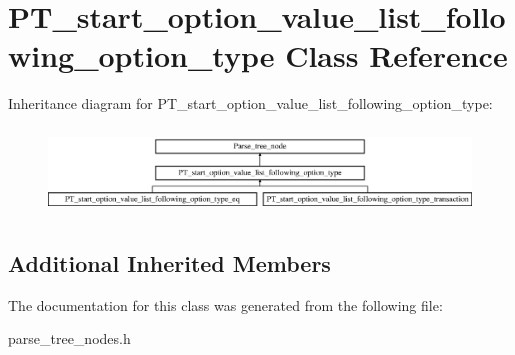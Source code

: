 \hypertarget{classPT__start__option__value__list__following__option__type}{}\section{P\+T\+\_\+start\+\_\+option\+\_\+value\+\_\+list\+\_\+following\+\_\+option\+\_\+type Class Reference}
\label{classPT__start__option__value__list__following__option__type}
Inheritance diagram for P\+T\+\_\+start\+\_\+option\+\_\+value\+\_\+list\+\_\+following\+\_\+option\+\_\+type\+:\begin{figure}[H]
\begin{center}
\leavevmode
\includegraphics[height=2.301370cm]{classPT__start__option__value__list__following__option__type}
\end{center}
\end{figure}
\subsection*{Additional Inherited Members}


The documentation for this class was generated from the following file\+:\begin{DoxyCompactItemize}
\item 
parse\+\_\+tree\+\_\+nodes.\+h\end{DoxyCompactItemize}
